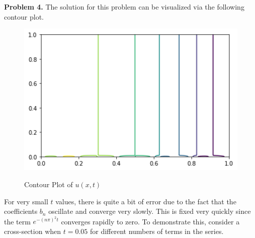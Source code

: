 \documentclass[12pt]{article}
\newcommand{\problem}[1]{\hspace{-4 ex} \large \textbf{Problem #1} }
\begin{document}
\problem{4. } The solution for this problem can be visualized via the following contour plot.

\begin{figure}[H]
	\caption{Contour Plot of $u(x,t)$}
	\includegraphics[width=1\textwidth]{tk01_figure_1}
	\label{contour}
	\centering
\end{figure}

For very small $t$ values, there is quite a bit of error due to the fact that the coefficients $b_n$ oscillate and converge very slowly. This is fixed very quickly since the term $e^{-(n \pi)^2t}$ converges rapidly to zero. To demonstrate this, consider a cross-section when $t=0.05$ for different numbers of terms in the series.
	
\end{document}

